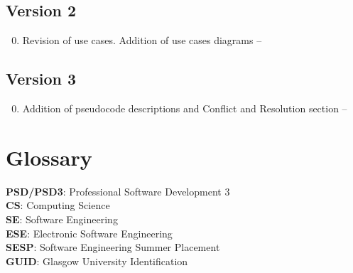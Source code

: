 \documentclass{l3deliverable}
\begin{document}
\subsection{Version 2}
\begin{enumerate}
\setcounter{enumi}{-1}
\item{Revision of use cases. Addition of use cases diagrams --  \date{2012/11/11}}
\end{enumerate}
\subsection{Version 3}
\begin{enumerate}
\setcounter{enumi}{-1}
\item{Addition of pseudocode descriptions and Conflict and Resolution section -- \date{2012/11/12}}
\end{enumerate}

\section{Glossary}
\textbf{PSD/PSD3}: Professional Software Development 3\\
\textbf{CS}: Computing Science\\
\textbf{SE}: Software Engineering\\
\textbf{ESE}: Electronic Software Engineering\\
\textbf{SESP}: Software Engineering Summer Placement\\
\textbf{GUID}: Glasgow University Identification\\








\end{document}
